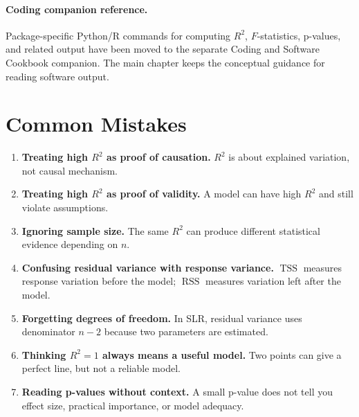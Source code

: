 \paragraph{Coding companion reference.}
Package-specific Python/R commands for computing \(R^2\), \(F\)-statistics, p-values, and related output have been moved to the separate Coding and Software Cookbook companion.  The main chapter keeps the conceptual guidance for reading software output.

\section{Common Mistakes}

\begin{enumerate}
  \item \textbf{Treating high $R^2$ as proof of causation.}  $R^2$ is about explained variation, not causal mechanism.
  \item \textbf{Treating high $R^2$ as proof of validity.}  A model can have high $R^2$ and still violate assumptions.
  \item \textbf{Ignoring sample size.}  The same $R^2$ can produce different statistical evidence depending on $n$.
  \item \textbf{Confusing residual variance with response variance.}  $\operatorname{TSS}$ measures response variation before the model; $\operatorname{RSS}$ measures variation left after the model.
  \item \textbf{Forgetting degrees of freedom.}  In SLR, residual variance uses denominator $n-2$ because two parameters are estimated.
  \item \textbf{Thinking $R^2=1$ always means a useful model.}  Two points can give a perfect line, but not a reliable model.
  \item \textbf{Reading p-values without context.}  A small p-value does not tell you effect size, practical importance, or model adequacy.
\end{enumerate}

